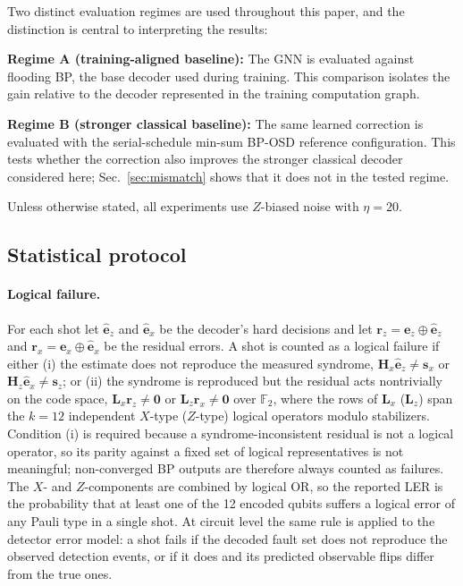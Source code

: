 \documentclass[a4paper,twocolumn,11pt,nopdfoutputerror]{quantumarticle}
\newcommand{\F}{\mathbb{F}}
\newcommand{\Hmat}{\mathbf{H}}
\begin{document}
Two distinct evaluation regimes are used throughout this paper,
and the distinction is central to interpreting the results:

\textbf{Regime A (training-aligned baseline):} The GNN is evaluated
against flooding BP, the base decoder used during training. This
comparison isolates the gain relative to the decoder represented in the
training computation graph.

\textbf{Regime B (stronger classical baseline):} The same learned
correction is evaluated with the serial-schedule min-sum BP-OSD reference
configuration. This tests whether the correction also improves the
stronger classical decoder considered here; Sec.~\ref{sec:mismatch}
shows that it does not in the tested regime.

Unless otherwise stated, all experiments use $Z$-biased noise with
$\eta = 20$.

\subsection{Statistical protocol}\label{sec:metrics}

\paragraph{Logical failure.}
For each shot let $\hat{\mathbf{e}}_z$ and $\hat{\mathbf{e}}_x$ be the
decoder's hard decisions and let
$\mathbf{r}_z=\mathbf{e}_z\oplus\hat{\mathbf{e}}_z$ and
$\mathbf{r}_x=\mathbf{e}_x\oplus\hat{\mathbf{e}}_x$ be the residual
errors. A shot is counted as a logical failure if either
(i) the estimate does not reproduce the measured syndrome,
$\Hmat_x\hat{\mathbf{e}}_z\neq\mathbf{s}_x$ or
$\Hmat_z\hat{\mathbf{e}}_x\neq\mathbf{s}_z$; or
(ii) the syndrome is reproduced but the residual acts nontrivially on the
code space, $\mathbf{L}_x\mathbf{r}_z\neq\mathbf{0}$ or
$\mathbf{L}_z\mathbf{r}_x\neq\mathbf{0}$ over $\F_2$, where the rows of
$\mathbf{L}_x$ ($\mathbf{L}_z$) span the $k=12$ independent $X$-type
($Z$-type) logical operators modulo stabilizers. Condition (i) is required
because a syndrome-inconsistent residual is not a logical operator, so its
parity against a fixed set of logical representatives is not meaningful;
non-converged BP outputs are therefore always counted as failures. The
$X$- and $Z$-components are combined by logical OR, so the reported LER is
the probability that at least one of the 12 encoded qubits suffers a
logical error of any Pauli type in a single shot. At circuit level the same
rule is applied to the detector error model: a shot fails if the decoded
fault set does not reproduce the observed detection events, or if it does
and its predicted observable flips differ from the true ones.
\end{document}

